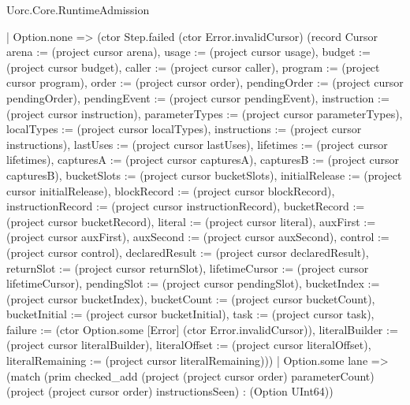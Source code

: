 \begin{lexlean}{Uorc.Core.RuntimeAdmission}
\begin{semanticmodule}
{            | Option.none => (ctor Step.failed (ctor Error.invalidCursor) (record Cursor {arena := (project cursor arena), usage := (project cursor usage), budget := (project cursor budget), caller := (project cursor caller), program := (project cursor program), order := (project cursor order), pendingOrder := (project cursor pendingOrder), pendingEvent := (project cursor pendingEvent), instruction := (project cursor instruction), parameterTypes := (project cursor parameterTypes), localTypes := (project cursor localTypes), instructions := (project cursor instructions), lastUses := (project cursor lastUses), lifetimes := (project cursor lifetimes), capturesA := (project cursor capturesA), capturesB := (project cursor capturesB), bucketSlots := (project cursor bucketSlots), initialRelease := (project cursor initialRelease), blockRecord := (project cursor blockRecord), instructionRecord := (project cursor instructionRecord), bucketRecord := (project cursor bucketRecord), literal := (project cursor literal), auxFirst := (project cursor auxFirst), auxSecond := (project cursor auxSecond), control := (project cursor control), declaredResult := (project cursor declaredResult), returnSlot := (project cursor returnSlot), lifetimeCursor := (project cursor lifetimeCursor), pendingSlot := (project cursor pendingSlot), bucketIndex := (project cursor bucketIndex), bucketCount := (project cursor bucketCount), bucketInitial := (project cursor bucketInitial), task := (project cursor task), failure := (ctor Option.some [Error] (ctor Error.invalidCursor)), literalBuilder := (project cursor literalBuilder), literalOffset := (project cursor literalOffset), literalRemaining := (project cursor literalRemaining)}))
            | Option.some lane => (match (prim checked_add (project (project cursor order) parameterCount) (project (project cursor order) instructionsSeen) : (Option UInt64))
}
\end{semanticmodule}
\end{lexlean}
